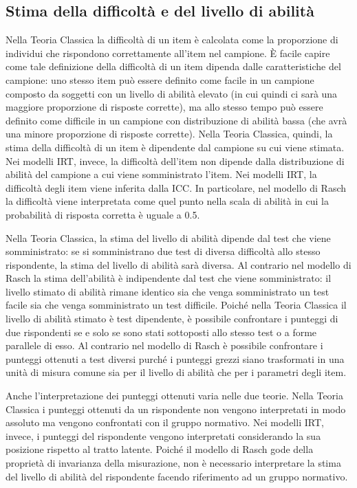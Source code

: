 \subsection{Stima della difficoltà e del livello di abilità}

Nella Teoria Classica la difficoltà di un item è calcolata come la proporzione di individui che rispondono correttamente all'item nel campione. È facile capire come tale definizione della difficoltà di un item dipenda dalle caratteristiche del campione: uno stesso item può essere definito come facile in un campione composto da soggetti con un livello di abilità elevato (in cui quindi ci sarà una maggiore proporzione di risposte corrette), ma allo stesso tempo può essere definito come difficile in un campione con distribuzione di abilità bassa (che avrà una minore proporzione di risposte corrette). Nella Teoria Classica, quindi, la stima della difficoltà di un item è dipendente dal campione su cui viene stimata. Nei modelli IRT, invece, la difficoltà dell'item non dipende dalla distribuzione di abilità del campione a cui viene somministrato l'item. Nei modelli IRT, la difficoltà degli item viene inferita dalla ICC. In particolare, nel modello di Rasch la difficoltà viene interpretata come quel punto nella scala di abilità in cui la probabilità di risposta corretta è uguale a 0.5. 

Nella Teoria Classica, la stima del livello di abilità dipende dal test che viene somministrato: se si somministrano due test di diversa difficoltà allo stesso rispondente, la stima del livello di abilità sarà diversa. Al contrario nel modello di Rasch la stima dell'abilità è indipendente dal test che viene somministrato: il livello stimato di abilità rimane identico sia che venga somministrato un test facile sia che venga somministrato un test difficile. Poiché nella Teoria Classica il livello di abilità stimato è test dipendente, è possibile confrontare i punteggi di due rispondenti se e solo se sono stati sottoposti allo stesso test o a forme parallele di esso. Al contrario nel modello di Rasch è possibile confrontare i punteggi ottenuti a test diversi purché i punteggi grezzi siano trasformati in una unità di misura comune sia per il livello di abilità che per i parametri degli item.

Anche l'interpretazione dei punteggi ottenuti varia nelle due teorie. Nella Teoria Classica i punteggi ottenuti da un rispondente non vengono interpretati in modo assoluto ma vengono confrontati con il gruppo normativo. Nei modelli IRT, invece, i punteggi del rispondente vengono interpretati considerando la sua posizione rispetto al tratto latente. Poiché il modello di Rasch gode della proprietà di invarianza della misurazione, non è necessario interpretare la stima del livello di abilità del rispondente facendo riferimento ad un gruppo normativo. 


